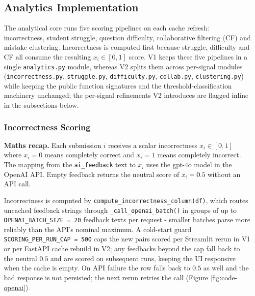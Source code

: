 \subsection{Analytics Implementation} \label{sec:analytics}

The analytical core runs five scoring pipelines on each cache refresh: incorrectness, student struggle, question difficulty, collaborative filtering (CF) and mistake clustering.
Incorrectness is computed first because struggle, difficulty and CF all consume the resulting $x_i \in [0,1]$ score. 
V1 keeps these five pipelines in a single \texttt{analytics.py} module, whereas V2 splits them across per-signal modules (\texttt{incorrectness.py}, \texttt{struggle.py}, \texttt{difficulty.py}, \texttt{collab.py}, \texttt{clustering.py}) while keeping the public function signatures and the threshold-classification machinery unchanged; the per-signal refinements V2 introduces are flagged inline in the subsections below.

\subsubsection{Incorrectness Scoring}

\textbf{Maths recap.}
Each submission $i$ receives a scalar incorrectness $x_i \in [0, 1]$ where $x_i = 0$ means completely correct and $x_i = 1$ means completely incorrect.
The mapping from the \texttt{ai\_feedback} text to $x_i$ uses the gpt-4o model in the OpenAI API.
Empty feedback returns the neutral score of $x_i = 0.5$ without an API call. 

Incorrectness is computed by \texttt{compute\_incorrectness\_column(df)}, which routes uncached feedback strings through \texttt{\_call\_openai\_batch()} in groups of up to \texttt{OPENAI\_BATCH\_SIZE = 20} feedback texts per request - smaller batches parse more reliably than the API's nominal maximum.
A cold-start guard \texttt{SCORING\_PER\_RUN\_CAP = 500} caps the new pairs scored per Streamlit rerun in V1 or per FastAPI cache rebuild in V2; any feedbacks beyond the cap fall back to the neutral $0.5$ and are scored on subsequent runs, keeping the UI responsive when the cache is empty.
On API failure the row falls back to $0.5$ as well and the bad response is not persisted; the next rerun retries the call (Figure \ref{fig:code-openai}).


